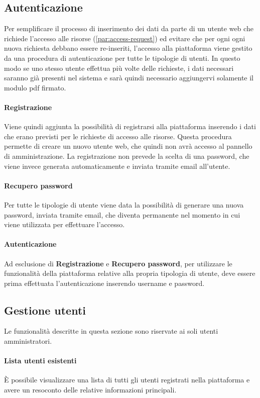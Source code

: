 \subsection{Autenticazione}
Per semplificare il processo di inserimento dei dati da parte di un utente web
che richiede l'accesso alle risorse (\ref{par:access-request}) ed evitare che
per ogni ogni nuova richiesta debbano essere re-inseriti, l'accesso alla piattaforma
viene gestito da una procedura di autenticazione per tutte le tipologie di utenti.
In questo modo se uno stesso utente effettua più volte delle richieste, i dati
necessari saranno già presenti nel sistema e sarà quindi necessario aggiungervi
solamente il modulo pdf firmato.

\paragraph{Registrazione}
Viene quindi aggiunta la possibilità di registrarsi alla piattaforma inserendo i
dati che erano previsti per le richieste di accesso alle risorse. Questa procedura
permette di creare un nuovo utente web, che quindi non avrà accesso al pannello
di amministrazione. La registrazione non prevede la scelta di una password, che
viene invece generata automaticamente e inviata tramite email all'utente.

\paragraph{Recupero password}
Per tutte le tipologie di utente viene data la possibilità di generare una nuova
password, inviata tramite email, che diventa permanente nel momento in cui
viene utilizzata per effettuare l'accesso.

\paragraph{Autenticazione}
Ad esclusione di \textbf{Registrazione} e \textbf{Recupero password}, per utilizzare
le funzionalità della piattaforma relative alla propria tipologia di utente,
deve essere prima effettuata l'autenticazione inserendo username e password.


\subsection{Gestione utenti}
Le funzionalità descritte in questa sezione sono riservate ai soli utenti
amministratori.

\paragraph{Lista utenti esistenti}
È possibile visualizzare una lista di tutti gli utenti registrati nella piattaforma
e avere un resoconto delle relative informazioni principali.

